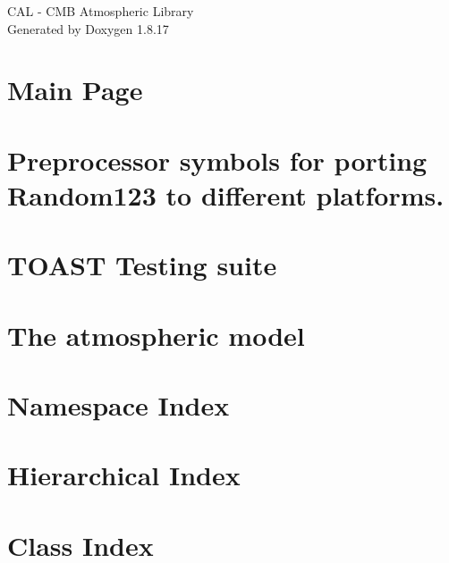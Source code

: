 \let\mypdfximage\pdfximage\def\pdfximage{\immediate\mypdfximage}\documentclass[twoside]{book}
\newcommand{\+}{\discretionary{\mbox{\scriptsize$\hookleftarrow$}}{}{}}
\newcommand{\clearemptydoublepage}{%
  \newpage{\pagestyle{empty}\cleardoublepage}%
}
\begin{document}
\hypersetup{pageanchor=false,
             bookmarksnumbered=true,
             pdfencoding=unicode
            }
\begin{titlepage}
\vspace*{7cm}
\begin{center}%
{\Large C\+AL -\/ C\+MB Atmospheric Library }\\
\vspace*{1cm}
{\large Generated by Doxygen 1.8.17}\\
\end{center}
\end{titlepage}
\clearemptydoublepage
{}
\tableofcontents
\clearemptydoublepage
{}
\hypersetup{pageanchor=true}

\chapter{Main Page}
\label{index}\hypertarget{index}{}
\chapter{Preprocessor symbols for porting Random123 to different platforms.}
\label{porting}

\chapter{T\+O\+A\+ST Testing suite}
\label{md__home_algebrato__progetti__c_m_b4_g_libcal_src_pycal_tests__r_e_a_d_m_e}

\chapter{The atmospheric model}
\label{church_model}

\chapter{Namespace Index}

\chapter{Hierarchical Index}

\chapter{Class Index}

\end{document}
